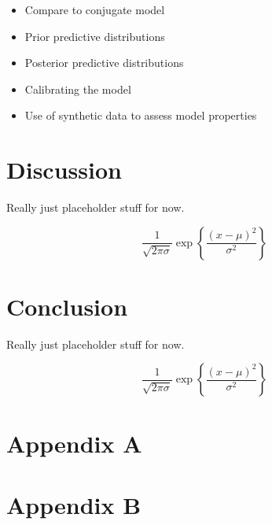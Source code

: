 \documentclass[
]{article}
\providecommand{\tightlist}{%
  \setlength{\itemsep}{0pt}\setlength{\parskip}{0pt}}
\begin{document}
\begin{itemize}
\tightlist
\item
  Compare to conjugate model
\item
  Prior predictive distributions
\item
  Posterior predictive distributions
\item
  Calibrating the model
\item
  Use of synthetic data to assess model properties
\end{itemize}

\hypertarget{discussion}{%
\section{Discussion}\label{discussion}}

Really just placeholder stuff for now.

\[
\frac{1}{\sqrt{2\pi\sigma}} \exp{\left\lbrace \frac{(x-\mu)^2}{\sigma^2} \right\rbrace}
\]

\hypertarget{conclusion}{%
\section{Conclusion}\label{conclusion}}

Really just placeholder stuff for now.

\[
\frac{1}{\sqrt{2\pi\sigma}} \exp{\left\lbrace \frac{(x-\mu)^2}{\sigma^2} \right\rbrace}
\]

\hypertarget{appendix-a}{%
\section*{Appendix A}\label{appendix-a}}


\hypertarget{appendix-b}{%
\section*{Appendix B}\label{appendix-b}}


  
\end{document}
